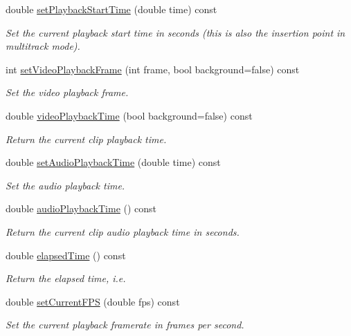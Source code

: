 \begin{DoxyCompactItemize}
double \hyperlink{classlives_1_1player_aa957df3e3bbd6ebcd04fd51fd61e6f70}{set\-Playback\-Start\-Time} (double time) const 
\begin{DoxyCompactList}\small\item\em Set the current playback start time in seconds (this is also the insertion point in multitrack mode). \end{DoxyCompactList}\item 
int \hyperlink{classlives_1_1player_ac565890c405838785db44093735e9283}{set\-Video\-Playback\-Frame} (int frame, bool background=false) const 
\begin{DoxyCompactList}\small\item\em Set the video playback frame. \end{DoxyCompactList}\item 
double \hyperlink{classlives_1_1player_ab3343d413584373c06cf37321a43232f}{video\-Playback\-Time} (bool background=false) const 
\begin{DoxyCompactList}\small\item\em Return the current clip playback time. \end{DoxyCompactList}\item 
double \hyperlink{classlives_1_1player_ae45069a96739c8f37ef3e13049c33d9c}{set\-Audio\-Playback\-Time} (double time) const 
\begin{DoxyCompactList}\small\item\em Set the audio playback time. \end{DoxyCompactList}\item 
double \hyperlink{classlives_1_1player_a6a3edffe9d14bd5b9bc3a3f0a60dc3b0}{audio\-Playback\-Time} () const 
\begin{DoxyCompactList}\small\item\em Return the current clip audio playback time in seconds. \end{DoxyCompactList}\item 
double \hyperlink{classlives_1_1player_a412c342ef5220bafba0c479e9ef9111f}{elapsed\-Time} () const 
\begin{DoxyCompactList}\small\item\em Return the elapsed time, i.\-e. \end{DoxyCompactList}\item 
double \hyperlink{classlives_1_1player_a15a2921cbcfe6092deced20e0b05c914}{set\-Current\-F\-P\-S} (double fps) const 
\begin{DoxyCompactList}\small\item\em Set the current playback framerate in frames per second. \end{DoxyCompactList}\item 

\end{DoxyCompactItemize}
